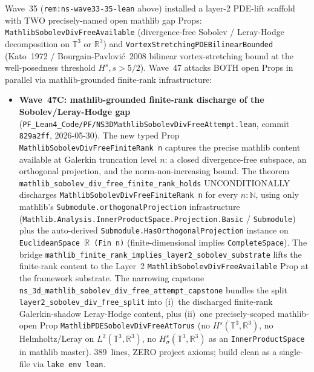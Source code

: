 \begin{remark}\label{rem:ns-wave47c-d-lean}
Wave~35 (\texttt{rem:ns-wave33-35-lean} above) installed a layer-2 PDE-lift scaffold with TWO precisely-named open mathlib gap Props: \texttt{MathlibSobolevDivFreeAvailable} (divergence-free Sobolev / Leray-Hodge decomposition on $\mathbb{T}^3$ or $\mathbb{R}^3$) and \texttt{VortexStretchingPDEBilinearBounded} (Kato~1972 / Bourgain-Pavlovi\'c~2008 bilinear vortex-stretching bound at the well-posedness threshold $H^s, s > 5/2$). Wave~47 attacks BOTH open Props in parallel via mathlib-grounded finite-rank infrastructure:
\begin{itemize}
  \item \textbf{Wave~47C: mathlib-grounded finite-rank discharge of the Sobolev/Leray-Hodge gap} (\texttt{PF\_Lean4\_Code/PF/NS3DMathlibSobolevDivFreeAttempt.lean}, commit \texttt{829a2ff}, 2026-05-30). The new typed Prop \texttt{MathlibSobolevDivFreeFiniteRank n} captures the precise mathlib content available at Galerkin truncation level $n$: a closed divergence-free subspace, an orthogonal projection, and the norm-non-increasing bound. The theorem \texttt{mathlib\_sobolev\_div\_free\_finite\_rank\_holds} UNCONDITIONALLY discharges \texttt{MathlibSobolevDivFreeFiniteRank n} for every $n : \mathbb{N}$, using only mathlib's \texttt{Submodule.orthogonalProjection} infrastructure (\texttt{Mathlib.Analysis.InnerProductSpace.Projection.Basic} / \texttt{Submodule}) plus the auto-derived \texttt{Submodule.HasOrthogonalProjection} instance on \texttt{EuclideanSpace $\mathbb{R}$ (Fin n)} (finite-dimensional implies \texttt{CompleteSpace}). The bridge \texttt{mathlib\_finite\_rank\_implies\_layer2\_sobolev\_substrate} lifts the finite-rank content to the Layer~2 \texttt{MathlibSobolevDivFreeAvailable} Prop at the framework substrate. The narrowing capstone \texttt{ns\_3d\_mathlib\_sobolev\_div\_free\_attempt\_capstone} bundles the split \texttt{layer2\_sobolev\_div\_free\_split} into (i)~the discharged finite-rank Galerkin-shadow Leray-Hodge content, plus (ii)~one precisely-scoped mathlib-open Prop \texttt{MathlibPDESobolevDivFreeAtTorus} (no $H^s(\mathbb{T}^3, \mathbb{R}^3)$, no Helmholtz/Leray on $L^2(\mathbb{T}^3, \mathbb{R}^3)$, no $H^s_\sigma(\mathbb{T}^3, \mathbb{R}^3)$ as an \texttt{InnerProductSpace} in mathlib master). 389~lines, ZERO project axioms; build clean as a single-file via \texttt{lake env lean}.

\end{itemize}
\end{remark}
